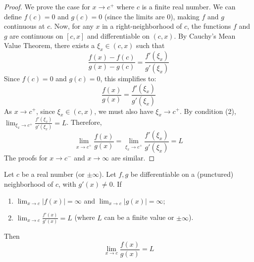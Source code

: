 \documentclass[oneside]{book}
\begin{document}
\begin{proof}
We prove the case for $x \to c^+$ where $c$ is a finite real number.
We can define $f(c) = 0$ and $g(c) = 0$ (since the limits are 0), making $f$ and $g$ continuous at $c$.
Now, for any $x$ in a right-neighborhood of $c$, the functions $f$ and $g$ are continuous on $[c, x]$ and differentiable on $(c, x)$.
By Cauchy's Mean Value Theorem, there exists a $\xi_x \in (c, x)$ such that
\[
\frac{f(x) - f(c)}{g(x) - g(c)} = \frac{f'(\xi_x)}{g'(\xi_x)}
\]
Since $f(c)=0$ and $g(c)=0$, this simplifies to:
\[
\frac{f(x)}{g(x)} = \frac{f'(\xi_x)}{g'(\xi_x)}
\]
As $x \to c^+$, since $\xi_x \in (c, x)$, we must also have $\xi_x \to c^+$.
By condition (2), $\lim_{\xi_x \to c^+} \frac{f'(\xi_x)}{g'(\xi_x)} = L$.
Therefore,
\[
\lim_{x \to c^+} \frac{f(x)}{g(x)} = \lim_{\xi_x \to c^+} \frac{f'(\xi_x)}{g'(\xi_x)} = L
\]
The proofs for $x \to c^-$ and $x \to \infty$ are similar.
\end{proof}

\begin{theorem}
\label{thm:lhopital_inf_en}
Let $c$ be a real number (or $\pm\infty$). Let $f, g$ be differentiable on a (punctured) neighborhood of $c$, with $g'(x) \neq 0$.
If
\begin{enumerate}
    \item $\lim_{x \to c} |f(x)| = \infty$ and $\lim_{x \to c} |g(x)| = \infty$;
    \item $\lim_{x \to c} \frac{f'(x)}{g'(x)} = L$ (where $L$ can be a finite value or $\pm\infty$).
\end{enumerate}
Then
\[
\lim_{x \to c} \frac{f(x)}{g(x)} = L
\]
\end{theorem}
\end{document}
